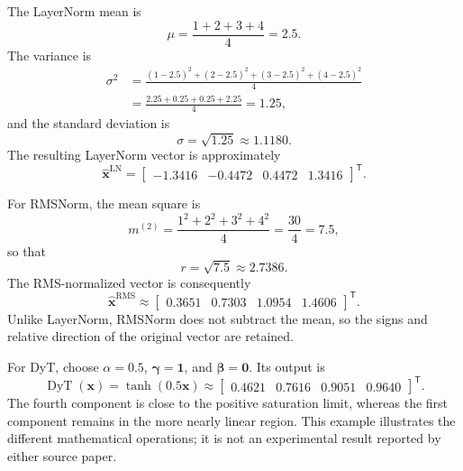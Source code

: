 The LayerNorm mean is
\begin{equation}
    \mu
    =
    \frac{1+2+3+4}{4}
    =
    2.5.
    \label{eq:norm-example-mean}
\end{equation}
The variance is
\begin{align}
    \sigma^2
    &=
    \frac{(1-2.5)^2+(2-2.5)^2
    +(3-2.5)^2+(4-2.5)^2}{4}
    \nonumber\\
    &=
    \frac{2.25+0.25+0.25+2.25}{4}
    =
    1.25,
    \label{eq:norm-example-variance}
\end{align}
and the standard deviation is
\begin{equation}
    \sigma=\sqrt{1.25}\approx1.1180.
    \label{eq:norm-example-std}
\end{equation}
The resulting LayerNorm vector is approximately
\begin{equation}
    \widehat{\mathbf{x}}^{\mathrm{LN}}
    =
    \begin{bmatrix}
        -1.3416 & -0.4472 & 0.4472 & 1.3416
    \end{bmatrix}^{\mathsf T}.
    \label{eq:norm-example-ln-output}
\end{equation}

For RMSNorm, the mean square is
\begin{equation}
    m^{(2)}
    =
    \frac{1^2+2^2+3^2+4^2}{4}
    =
    \frac{30}{4}
    =
    7.5,
    \label{eq:norm-example-mean-square}
\end{equation}
so that
\begin{equation}
    r=\sqrt{7.5}\approx2.7386.
    \label{eq:norm-example-rms}
\end{equation}
The RMS-normalized vector is consequently
\begin{equation}
    \widehat{\mathbf{x}}^{\mathrm{RMS}}
    \approx
    \begin{bmatrix}
        0.3651 & 0.7303 & 1.0954 & 1.4606
    \end{bmatrix}^{\mathsf T}.
    \label{eq:norm-example-rms-output}
\end{equation}
Unlike LayerNorm, RMSNorm does not subtract the mean, so the signs and
relative direction of the original vector are retained.

For DyT, choose \(\alpha=0.5\), \(\boldsymbol{\gamma}=\mathbf{1}\),
and \(\boldsymbol{\beta}=\mathbf{0}\). Its output is
\begin{equation}
    \operatorname{DyT}(\mathbf{x})
    =
    \tanh(0.5\mathbf{x})
    \approx
    \begin{bmatrix}
        0.4621 & 0.7616 & 0.9051 & 0.9640
    \end{bmatrix}^{\mathsf T}.
    \label{eq:norm-example-dyt-output}
\end{equation}
The fourth component is close to the positive saturation limit, whereas
the first component remains in the more nearly linear region. This example
illustrates the different mathematical operations; it is not an
experimental result reported by either source paper.

